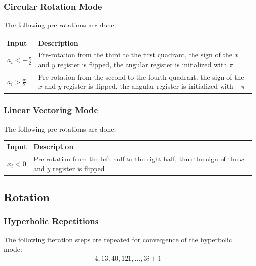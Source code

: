 \documentclass[a4paper, 12pt, notitlepage]{report}
\begin{document}
      \subsubsection{Circular Rotation Mode}
      The following pre-rotations are done:\newline\newline
         \begin{tabular}{@{}lp{380pt}@{}}
            \rowcolor{tableheadcolor}\textbf{Input} &\textbf{ Description }  \\

            $a_i < - \frac{\pi}{2}$    & Pre-rotation from the third to the first quadrant, 
                                         the sign of the $x$ and $y$ register is flipped, 
                                         the angular register is initialized with $\pi$   \\ \midrule

            $a_i >   \frac{\pi}{2}$    & Pre-rotation from the second to the fourth quadrant, 
                                         the sign of the $x$ and $y$ register is flipped, 
                                         the angular register is initialized with $-\pi$   \\
            \bottomrule
         \end{tabular}

      \subsubsection{Linear Vectoring Mode}
      The following pre-rotations are done:\newline\newline
         \begin{tabular}{@{}lp{380pt}@{}}
            \rowcolor{tableheadcolor}\textbf{Input} &\textbf{ Description }  \\

            $x_i < 0$          & Pre-rotation from the left half to the right half, thus
                                 the sign of the $x$ and $y$ register is flipped \\
            \bottomrule
         \end{tabular}


   \subsection{Rotation}

   \subsubsection{Hyperbolic Repetitions}
   The following iteration steps are repeated for convergence of the hyperbolic mode:
   \begin{eqnarray}
      4, 13, 40, 121, ..., 3i+1
   \end{eqnarray}
\end{document}
